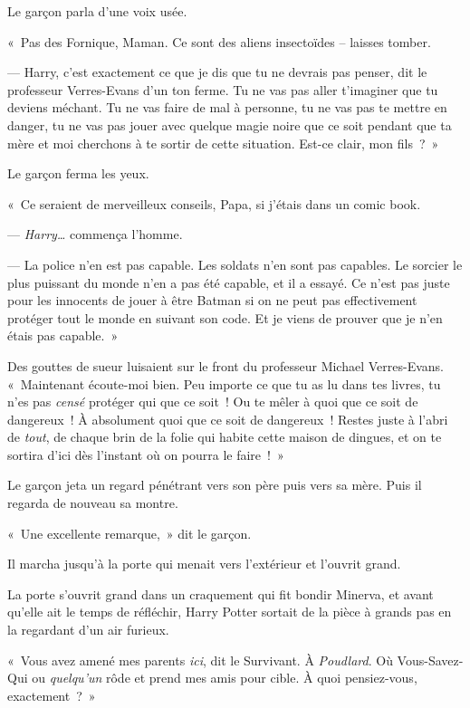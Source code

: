 Le garçon parla d'une voix usée.

«~Pas des Fornique, Maman. Ce sont des aliens insectoïdes -- laisses tomber.

--- Harry, c'est exactement ce que je dis que tu ne devrais pas penser, dit le professeur Verres-Evans d'un ton ferme. Tu ne vas pas aller t'imaginer que tu deviens méchant. Tu ne vas faire de mal à personne, tu ne vas pas te mettre en danger, tu ne vas pas jouer avec quelque magie noire que ce soit pendant que ta mère et moi cherchons à te sortir de cette situation. Est-ce clair, mon fils~?~»

Le garçon ferma les yeux.

«~Ce seraient de merveilleux conseils, Papa, si j'étais dans un comic book.

--- \emph{Harry…} commença l'homme.

--- La police n'en est pas capable. Les soldats n'en sont pas capables. Le sorcier le plus puissant du monde n'en a pas été capable, et il a essayé. Ce n'est pas juste pour les innocents de jouer à être Batman si on ne peut pas effectivement protéger tout le monde en suivant son code. Et je viens de prouver que je n'en étais pas capable.~»

Des gouttes de sueur luisaient sur le front du professeur Michael Verres-Evans. «~Maintenant écoute-moi bien. Peu importe ce que tu as lu dans tes livres, tu n'es pas \emph{censé} protéger qui que ce soit~! Ou te mêler à quoi que ce soit de dangereux~! À absolument quoi que ce soit de dangereux~! Restes juste à l'abri de \emph{tout}, de chaque brin de la folie qui habite cette maison de dingues, et on te sortira d'ici dès l'instant où on pourra le faire~!~»

Le garçon jeta un regard pénétrant vers son père puis vers sa mère. Puis il regarda de nouveau sa montre.

«~Une excellente remarque,~» dit le garçon.

Il marcha jusqu'à la porte qui menait vers l'extérieur et l'ouvrit grand.

\later

La porte s'ouvrit grand dans un craquement qui fit bondir Minerva, et avant qu'elle ait le temps de réfléchir, Harry Potter sortait de la pièce à grands pas en la regardant d'un air furieux.

«~Vous avez amené mes parents \emph{ici}, dit le Survivant. À \emph{Poudlard}. Où Vous-Savez-Qui ou \emph{quelqu'un} rôde et prend mes amis pour cible. À quoi pensiez-vous, exactement~?~»

